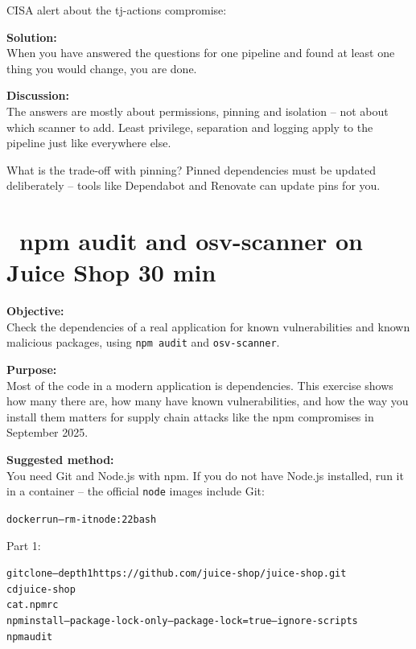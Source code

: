 \documentclass[a4paper,11pt,notitlepage]{report}
\begin{document}
CISA alert about the tj-actions compromise:\\
{\footnotesize{}}

{\bf Solution:}\\
When you have answered the questions for one pipeline and found at least one thing you would change, you are done.

{\bf Discussion:}\\
The answers are mostly about permissions, pinning and isolation -- not about which scanner to add. Least privilege, separation and logging apply to the pipeline just like everywhere else.

What is the trade-off with pinning? Pinned dependencies must be updated deliberately -- tools like Dependabot and Renovate can update pins for you.


\chapter{\faExclamationTriangle\ npm audit and osv-scanner on Juice Shop 30 min}
\label{ex:npm-audit-osv}

{\bf Objective:}\\
Check the dependencies of a real application for known vulnerabilities and known malicious packages, using \verb+npm audit+ and \verb+osv-scanner+.

{\bf Purpose:}\\
Most of the code in a modern application is dependencies. This exercise shows how many there are, how many have known vulnerabilities, and how the way you install them matters for supply chain attacks like the npm compromises in September 2025.

{\bf Suggested method:}\\
You need Git and Node.js with npm. If you do not have Node.js installed, run it in a container -- the official \verb+node+ images include Git:
\begin{alltt}\footnotesize
docker run --rm -it node:22 bash
\end{alltt}

Part 1:
\begin{alltt}\footnotesize
git clone --depth 1 https://github.com/juice-shop/juice-shop.git
cd juice-shop
cat .npmrc
npm install --package-lock-only --package-lock=true --ignore-scripts
npm audit
\end{alltt}
\end{document}
